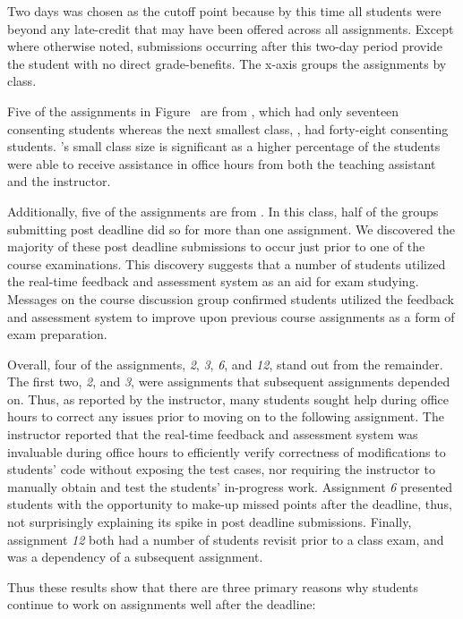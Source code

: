 Two days was chosen as the cutoff point because by this time all students were
beyond any late-credit that may have been offered across all
assignments. Except where otherwise noted, submissions occurring after this
two-day period provide the student with no direct grade-benefits. The x-axis
groups the assignments by class.

Five of the assignments in Figure~ are from ,
which had only seventeen consenting students whereas the next smallest class,
, had forty-eight consenting students. 's small class
size is significant as a higher percentage of the students were able to receive
assistance in office hours from both the teaching assistant and the instructor.

Additionally, five of the assignments are from . In this class, half
of the groups submitting post deadline did so for more than one assignment. We
discovered the majority of these post deadline submissions to occur just prior
to one of the course examinations. This discovery suggests that a number of
students utilized the real-time feedback and assessment system as an aid for
exam studying. Messages on the course discussion group confirmed students
utilized the feedback and assessment system to improve upon previous course
assignments as a form of exam preparation.

Overall, four of the assignments, \emph{2}, \emph{3}, \emph{6}, and \emph{12},
stand out from the remainder. The first two, \emph{2}, and \emph{3}, were
assignments that subsequent assignments depended on. Thus, as reported by the
instructor, many students sought help during office hours to correct any issues
prior to moving on to the following assignment. The instructor reported that
the real-time feedback and assessment system was invaluable during office hours
to efficiently verify correctness of modifications to students' code without
exposing the test cases, nor requiring the instructor to manually obtain and
test the students' in-progress work. Assignment \emph{6} presented students
with the opportunity to make-up missed points after the deadline, thus, not
surprisingly explaining its spike in post deadline submissions. Finally,
assignment \emph{12} both had a number of students revisit prior to a class
exam, and was a dependency of a subsequent assignment.

Thus these results show that there are three primary reasons why students
continue to work on assignments well after the deadline:

